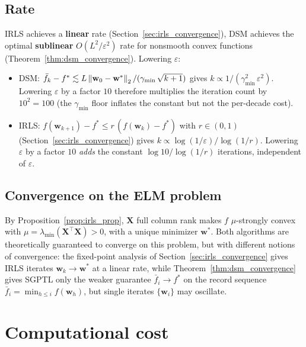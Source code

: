 \subsection{Rate}

IRLS achieves a \textbf{linear} rate (Section~\ref{sec:irls_convergence}), DSM achieves the optimal \textbf{sublinear} $O(L^2/\varepsilon^2)$ rate for nonsmooth convex functions~\cite[Slide 8]{frangioni-slides-nonsmooth} (Theorem~\ref{thm:dsm_convergence}). Lowering $\varepsilon$:
\begin{itemize}
  \item DSM: $\bar f_k - f^* \lesssim L\left\lVert \mathbf{w}_0 - \mathbf{w}^* \right\rVert_2/(\gamma_{\min}\,\sqrt{k+1})$ gives $k \propto 1/(\gamma_{\min}^{2}\,\varepsilon^2)$. Lowering $\varepsilon$ by a factor $10$ therefore multiplies the iteration count by $10^2 = 100$ (the $\gamma_{\min}$ floor inflates the constant but not the per-decade cost).
  \item IRLS: $f(\mathbf{w}_{k+1}) - f^* \le r\,(f(\mathbf{w}_k) - f^*)$ with $r \in (0,1)$ (Section~\ref{sec:irls_convergence}) gives $k \propto \log(1/\varepsilon)/\log(1/r)$. Lowering $\varepsilon$ by a factor $10$ \emph{adds} the constant $\log 10/\log(1/r)$ iterations, independent of $\varepsilon$.
\end{itemize}

\subsection{Convergence on the ELM problem}

By Proposition~\ref{prop:irls_prop}, $\mathbf{X}$ full column rank makes $f$ $\mu$-strongly convex with $\mu = \lambda_{\min}(\mathbf{X}^\top\mathbf{X}) > 0$, with a unique minimizer $\mathbf{w}^*$. Both algorithms are theoretically guaranteed to converge on this problem, but with different notions of convergence: the fixed-point analysis of Section~\ref{sec:irls_convergence} gives IRLS iterates $\mathbf{w}_k \to \mathbf{w}^*$ at a linear rate, while Theorem~\ref{thm:dsm_convergence} gives SGPTL only the weaker guarantee $\bar f_i \to f^*$ on the record sequence $\bar f_i = \min_{h \le i} f(\mathbf{w}_h)$, but single iterates $\{\mathbf{w}_i\}$ may oscillate.

\section{Computational cost}
\label{sec:comp_cost}


